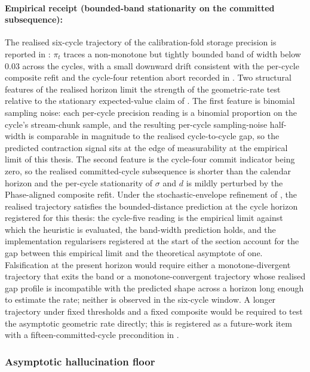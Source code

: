 \paragraph{Empirical receipt (bounded-band stationarity on the committed subsequence):} The realised six-cycle trajectory of the calibration-fold storage precision is reported in : $\pi_{t}$ traces a non-monotone but tightly bounded band of width below $0.03$ across the cycles, with a small downward drift consistent with the per-cycle composite refit and the cycle-four retention abort recorded in . Two structural features of the realised horizon limit the strength of the geometric-rate test relative to the stationary expected-value claim of . The first feature is binomial sampling noise: each per-cycle precision reading is a binomial proportion on the cycle's stream-chunk sample, and the resulting per-cycle sampling-noise half-width is comparable in magnitude to the realised cycle-to-cycle gap, so the predicted contraction signal sits at the edge of measurability at the empirical limit of this thesis. The second feature is the cycle-four commit indicator being zero, so the realised committed-cycle subsequence is shorter than the calendar horizon and the per-cycle stationarity of $\sigma$ and $d$ is mildly perturbed by the Phase-aligned composite refit. Under the stochastic-envelope refinement of , the realised trajectory satisfies the bounded-distance prediction at the cycle horizon registered for this thesis: the cycle-five reading is the empirical limit against which the heuristic is evaluated, the band-width prediction holds, and the implementation regularisers registered at the start of the section account for the gap between this empirical limit and the theoretical asymptote of one. Falsification at the present horizon would require either a monotone-divergent trajectory that exits the band or a monotone-convergent trajectory whose realised gap profile is incompatible with the predicted shape across a horizon long enough to estimate the rate; neither is observed in the six-cycle window. A longer trajectory under fixed thresholds and a fixed composite would be required to test the asymptotic geometric rate directly; this is registered as a future-work item with a fifteen-committed-cycle precondition in .

\subsubsection{Asymptotic hallucination floor}
\label{sec:theorem-asymptotic}

